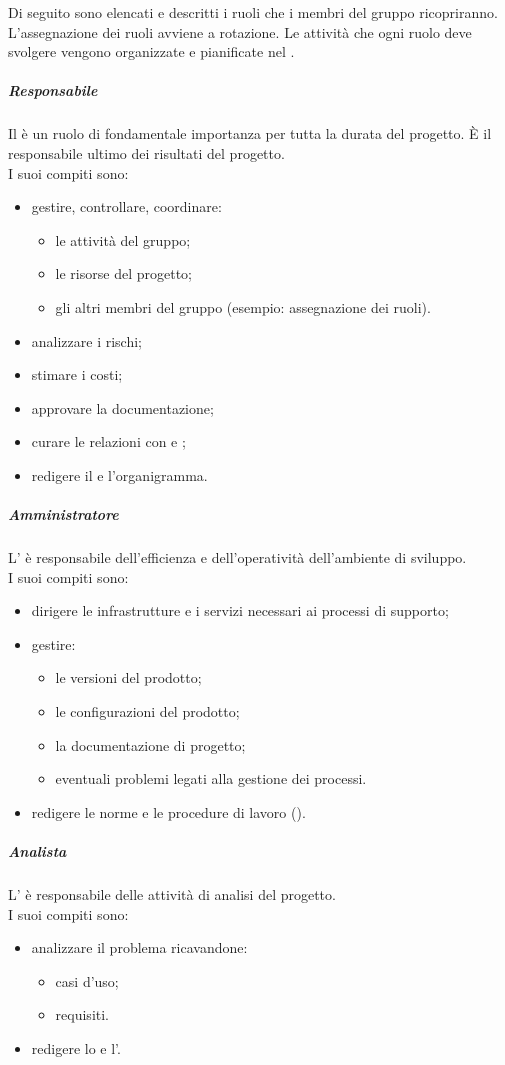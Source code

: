 Di seguito sono elencati e descritti i ruoli che i membri del gruppo ricopriranno. L'assegnazione dei ruoli avviene a rotazione. Le attività che ogni ruolo deve svolgere vengono organizzate e pianificate nel \PdP{}. 

\subparagraph{Responsabile}
Il \respProg{} è un ruolo di fondamentale importanza per tutta la durata del progetto. È il responsabile ultimo dei risultati del progetto.\\I suoi compiti sono:
\begin{itemize}
\item gestire, controllare, coordinare:
\begin{itemize}
\item le attività del gruppo;
\item le risorse del progetto;
\item gli altri membri del gruppo (esempio: assegnazione dei ruoli).
\end{itemize}
\item analizzare i rischi;
\item stimare i costi;
\item approvare la documentazione;
\item curare le relazioni con \proponProg{} e \commitProg{};
\item redigere il \PdP{} e l'organigramma.
\end{itemize} 

\subparagraph{Amministratore}
L'\ammProg{} è responsabile dell'efficienza e dell'operatività dell'ambiente di sviluppo.\\I suoi compiti sono: 
\begin{itemize}
\item dirigere le infrastrutture e i servizi necessari ai processi di supporto; 
\item gestire:
\begin{itemize}
\item le versioni del prodotto;
\item le configurazioni del prodotto;
\item la documentazione di progetto;
\item eventuali problemi legati alla gestione dei processi.
\end{itemize} 
\item redigere le norme e le procedure di lavoro (\NdP{}).
\end{itemize}

\subparagraph{Analista}
L'\analProg{} è responsabile delle attività di analisi del progetto.\\I suoi compiti sono:
\begin{itemize}
\item analizzare il problema ricavandone:
\begin{itemize}
\item casi d'uso;
\item requisiti.
\end{itemize}
\item redigere lo \SdF{} e l'\AdR{}.
\end{itemize}  

